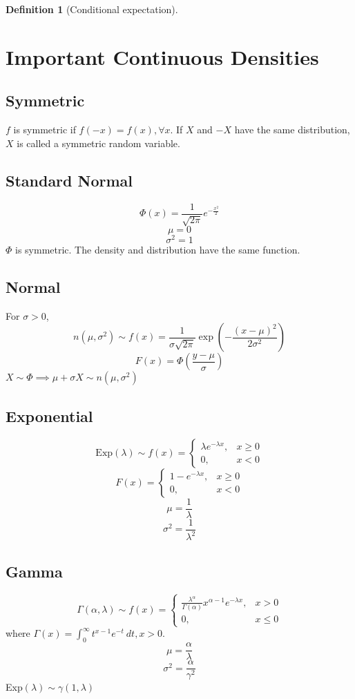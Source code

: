 \documentclass[10pt, a4paper]{extarticle}
\theoremstyle{definition}
\newtheorem{defn}{Definition}
\begin{document}
\begin{defn}[Conditional expectation]
	\section{Important Continuous Densities}
	\subsection{Symmetric}
	$f$ is symmetric if $f(-x)=f(x),\forall x$. If $X$ and $-X$ have the same distribution, $X$ is called a symmetric random variable.

	\subsection{Standard Normal}
	\[\Phi(x)=\frac{1}{\sqrt{2\pi}}e^{-\frac{x^2}{2}}\]
	\[\mu=0\]
	\[\sigma^2=1\]
	$\Phi$ is symmetric. The density and distribution have the same function.

	\subsection{Normal}
	For $\sigma>0$,
	\[n(\mu,\sigma^2)\sim f(x)=\frac{1}{\sigma\sqrt{2\pi}}\exp\left(-\frac{(x-\mu)^2}{2\sigma^2}\right)\]
		\[F(x)=\Phi\left(\frac{y-\mu}{\sigma}\right)\]
	$X\sim \Phi\implies \mu+\sigma X\sim n(\mu,\sigma^2)$

	\subsection{Exponential}
	\[\text{Exp}(\lambda)\sim f(x)=
		\begin{cases}
			\lambda e^{-\lambda x},&x\geq 0\\
			0,&x<0
		\end{cases}
	\]
	\[F(x)=
		\begin{cases}
			1- e^{-\lambda x},&x\geq 0\\
			0,&x<0
		\end{cases}
	\]
	\[\mu=\frac{1}{\lambda}\]
	\[\sigma^2=\frac{1}{\lambda^2}\]

	\subsection{Gamma}
	\[\Gamma(\alpha,\lambda)\sim f(x)=
		\begin{cases}
			\frac{\lambda^\alpha}{\Gamma(\alpha)}x^{\alpha-1} e^{-\lambda x},&x> 0\\
			0,&x\leq 0
		\end{cases}
	\]
	where $\Gamma(x)=\int_0^\infty t^{x-1}e^{-t}\ dt, x>0$.
	\[\mu=\frac{\alpha}{\lambda}\]
	\[\sigma^2=\frac{\alpha}{\gamma^2}\]
	Exp$(\lambda)\sim \gamma(1,\lambda)$


\end{defn}
\end{document}
